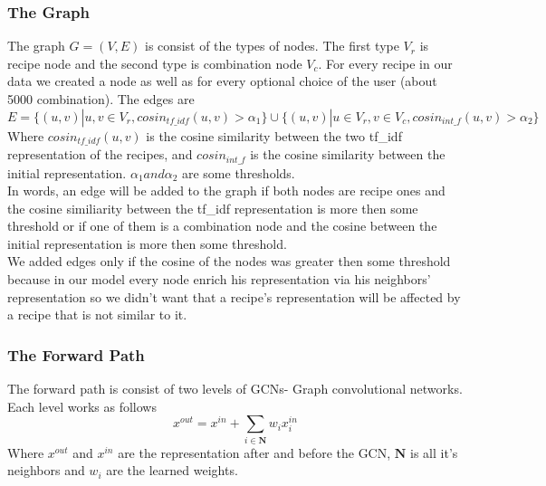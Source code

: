 \documentclass[]{article}
\begin{document}
\subsubsection{The Graph}
The graph $G=(V,E)$ is consist of the types of nodes. The first type $V_r$ is recipe node and the second type is combination node $V_c$. For every recipe in our data we created a node as well as for every optional choice of the user (about 5000 combination). The edges are 
$$E = \{(u,v)|u,v \in V_r, cosin_{tf\_idf}(u,v)>\alpha_1\}\cup\{(u,v)|u\in V_r, v\in V_c, cosin_{int\_f}(u,v)>\alpha_2\}$$
Where $cosin_{tf\_idf}(u,v)$ is the cosine similarity between the two tf\_idf representation of the recipes, and $cosin_{int\_f}$ is the cosine similarity between the initial representation. $\alpha_1 an d\alpha_2$ are some thresholds.\\ 
In words, an edge will be added to the graph if both nodes are recipe ones and the cosine similiarity between the tf\_idf representation is more then some threshold or if one of them is a combination node and the cosine between the initial representation is more then some threshold.\\
We added edges only if the cosine of the nodes was greater then some threshold because in our model every node enrich his representation via his neighbors' representation so we didn't want that a recipe's representation will be affected by a recipe that is not similar to it.

\subsubsection{The Forward Path}
The forward path is consist of two levels of GCNs- Graph convolutional networks.
Each level works as follows 
$$x^{out} = x^{in} + \sum_{i \in \mathbf{N}} w_i x^{in}_{i}$$
Where $x^{out}$ and $x^{in}$ are the representation after and before the GCN, $\mathbf{N}$ is all it's neighbors and $w_i$ are the learned weights.
\end{document}
